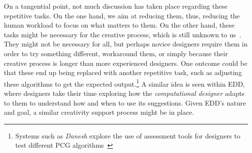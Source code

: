 On a tangential point, not much discussion has taken place regarding these repetitive tasks. On the one hand, we aim at reducing them, thus, reducing the human workload to focus on what matters to them. On the other hand, these tasks might be necessary for the creative process, which is still unknown to us~\cite{boden_creative_2004}. They might not be necessary for all, but perhaps novice designers require them in order to try something different, workaround them, or simply because their creative process is longer than more experienced designers. One outcome could be that these end up being replaced with another repetitive task, such as adjusting these algorithms to get the expected output.\footnote{Systems such as \emph{Danesh} explore the use of assessment tools for designers to test different PCG algorithms~\cite{cook_danesh_2021}} A similar idea is seen within EDD, where designers take their time exploring how the \emph{computational designer} adapts to them to understand how and when to use its suggestions. Given EDD's nature and goal, a similar creativity support process might be in place.





